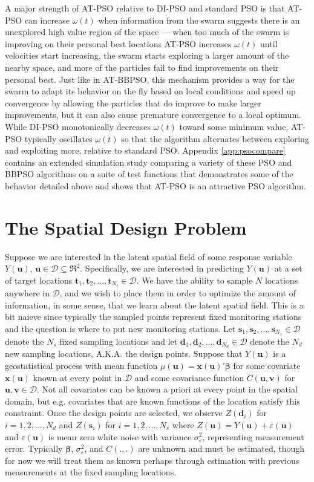 \documentclass[12pt]{article}
\begin{document}
A major strength of AT-PSO relative to DI-PSO and standard PSO is that AT-PSO can increase $\omega(t)$ when information from the swarm suggests there is an unexplored high value region of the space --- when too much of the swarm is improving on their personal best locations AT-PSO increases $\omega(t)$ until velocities start increasing, the swarm starts exploring a larger amount of the nearby space, and more of the particles fail to find improvements on their personal best. Just like in AT-BBPSO, this mechanism provides a way for the swarm to adapt its behavior on the fly based on local conditions and speed up convergence by allowing the particles that do improve to make larger improvements, but it can also cause premature convergence to a local optimum. While DI-PSO monotonically decreases $\omega(t)$ toward some minimum value, AT-PSO typically oscillates $\omega(t)$ so that the algorithm alternates between exploring and exploiting more, relative to standard PSO. Appendix \ref{app:psocompare} contains an extended simulation study comparing a variety of these PSO and BBPSO algorithms on a suite of test functions that demonstrates some of the behavior detailed above and shows that AT-PSO is an attractive PSO algorithm. 

\section{The Spatial Design Problem}\label{sec:spatialdesign}
Suppose we are interested in the latent spatial field of some response variable $Y(\bm{u})$, $\bm{u}\in \mathcal{D}\subseteq \Re^2$. Specifically, we are interested in predicting $Y(\bm{u})$ at a set of target locations $\bm{t}_1, \bm{t}_2, \dots, \bm{t}_{N_t}\in\mathcal{D}$. We have the ability to sample $N$ locations anywhere in $\mathcal{D}$, and we wish to place them in order to optimize the amount of information, in some sense, that we learn about the latent spatial field. This is a bit naieve since typically the sampled points represent fixed monitoring stations and the question is where to put new monitoring stations. Let $\bm{s}_1, \bm{s}_2, \dots, \bm{s}_{N_s}\in\mathcal{D}$ denote the $N_s$ fixed sampling locations and let $\bm{d}_1, \bm{d}_2, \dots, \bm{d}_{N_d}\in\mathcal{D}$ denote the $N_d$ new sampling locations, A.K.A. the design points. Suppose that $Y(\bm{u})$ is a geostatistical process with mean function $\mu(\bm{u})=\bm{x}(\bm{u})'\bm{\beta}$ for some covariate $\bm{x}(\bm{u})$ known at every point in $\mathcal{D}$ and some covariance function $C(\bm{u}, \bm{v})$ for $\bm{u},\bm{v}\in\mathcal{D}$. Not all covariates can be known a priori at every point in the spatial domain, but e.g. covariates that are known functions of the location satisfy this constraint. Once the design points are selected, we observe $Z(\bm{d}_i)$ for $i=1,2,\dots,N_d$ and $Z(\bm{s}_i)$ for $i=1,2,\dots,N_s$ where $Z(\bm{u}) = Y(\bm{u}) + \varepsilon(\bm{u})$ and $\varepsilon(\bm{u})$ is mean zero white noise with variance $\sigma^2_{\varepsilon}$, representing measurement error. Typically $\bm{\beta}$, $\sigma^2_{\varepsilon}$, and $C(.,.)$ are unknown and must be estimated, though for now we will treat them as known perhaps through estimation with previous measurements at the fixed sampling locations. 
\end{document}
